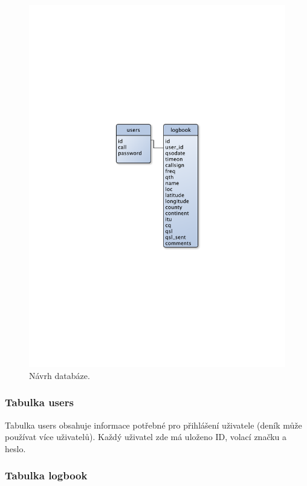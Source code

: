 \begin{figure}[h]
\centering
\includegraphics[trim=9cm 9cm 9cm 9cm, scale=0.7]{fig/navrh_databaze}
\caption{Návrh databáze.}
\label{fig:databaze}
\end{figure}

\subsubsection{Tabulka users}

Tabulka users obsahuje informace potřebné pro přihlášení uživatele (deník může
používat více uživatelů). Každý uživatel zde má uloženo ID, volací značku a
heslo.

\subsubsection{Tabulka logbook}

